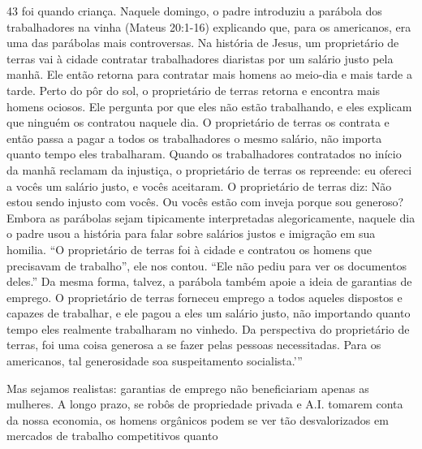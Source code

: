 43 foi quando criança. Naquele domingo, o padre introduziu a parábola dos trabalhadores na vinha (Mateus 20:1-16) explicando que, para os americanos, era uma das parábolas mais controversas. Na história de Jesus, um proprietário de terras vai à cidade contratar trabalhadores diaristas por um salário justo pela manhã. Ele então retorna para contratar mais homens ao meio-dia e mais tarde a tarde. Perto do pôr do sol, o proprietário de terras retorna e encontra mais homens ociosos. Ele pergunta por que eles não estão trabalhando, e eles explicam que ninguém os contratou naquele dia. O proprietário de terras os contrata e então passa a pagar a todos os trabalhadores o mesmo salário, não importa quanto tempo eles trabalharam. Quando os trabalhadores contratados no início da manhã reclamam da injustiça, o proprietário de terras os repreende: eu ofereci a vocês um salário justo, e vocês aceitaram. O proprietário de terras diz: Não estou sendo injusto com vocês. Ou vocês estão com inveja porque sou generoso? Embora as parábolas sejam tipicamente interpretadas alegoricamente, naquele dia o padre usou a história para falar sobre salários justos e imigração em sua homilia. “O proprietário de terras foi à cidade e contratou os homens que precisavam de trabalho”, ele nos contou. “Ele não pediu para ver os documentos deles.” Da mesma forma, talvez, a parábola também apoie a ideia de garantias de emprego. O proprietário de terras forneceu emprego a todos aqueles dispostos e capazes de trabalhar, e ele pagou a eles um salário justo, não importando quanto tempo eles realmente trabalharam no vinhedo. Da perspectiva do proprietário de terras, foi uma coisa generosa a se fazer pelas pessoas necessitadas. Para os americanos, tal generosidade soa suspeitamento socialista.'”
 \par 
Mas sejamos realistas: garantias de emprego não beneficiariam apenas as mulheres. A longo prazo, se robôs de propriedade privada e A.I. tomarem conta da nossa economia, os homens orgânicos podem se ver tão desvalorizados em mercados de trabalho competitivos quanto
 \par 
